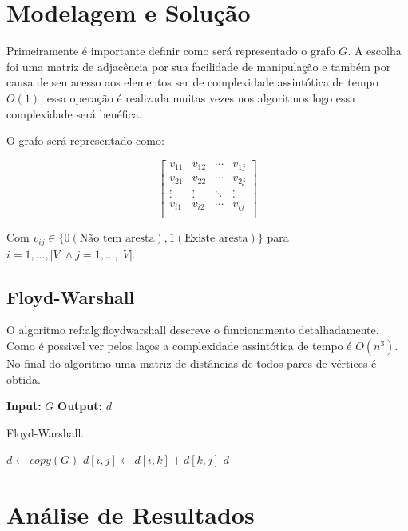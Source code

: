 \documentclass[11pt]{article}
\begin{document}
\section{Modelagem e Solução}
\label{sec:orge76cdb2}

Primeiramente é importante definir como será representado o grafo \(G\). A escolha foi uma matriz de adjacência por sua facilidade de manipulação e também por causa de seu acesso aos elementos ser de complexidade assintótica de tempo \(O(1)\), essa operação é realizada muitas vezes nos algoritmos logo essa complexidade será benéfica.

O grafo será representado como:

\begin{equation}
\begin{bmatrix}
 v_{11} & v_{12} & \cdots & v_{1j} \\
 v_{21} & v_{22} & \cdots & v_{2j} \\
 \vdots & \vdots & \ddots & \vdots \\
 v_{i1} & v_{i2} & \cdots & v_{ij} \\
\end{bmatrix}
\end{equation}

Com \(v_{ij} \in \{0(\text{Não tem aresta}),1(\text{Existe aresta})\}\) para \(i=1,...,|V| \land j=1,...,|V|\).

\subsection{Floyd-Warshall}
\label{sec:org03230c5}

O algoritmo ref:alg:floydwarshall descreve o funcionamento detalhadamente. Como é possivel ver pelos laços a complexidade assintótica de tempo é \(O(n^3)\). No final do algoritmo uma matriz de distâncias de todos pares de vértices é obtida.

\begin{algorithm}
\textbf{Input:} $G$
\textbf{Output:} $d$
\caption{Floyd-Warshall.}\label{alg:floydwarshall}
\begin{algorithmic}[1]
\State $d\gets copy(G)$
\State $d[i,j]\gets d[i,k]+d[k,j]$
\EndIf
\EndFor
\EndFor
\EndFor
\State \Return $d$
\EndProcedure
\end{algorithmic}
\end{algorithm}

\section{Análise de Resultados}
\label{sec:org180bcbc}
\end{document}
